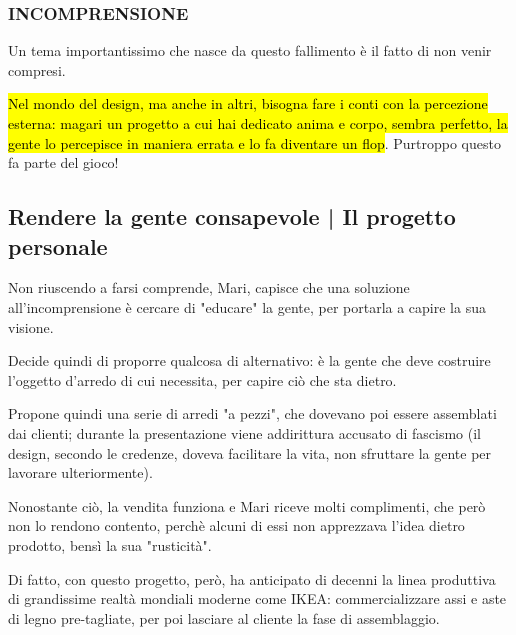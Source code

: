 \subsubsection{INCOMPRENSIONE}
Un tema importantissimo che nasce da questo fallimento è il fatto di non venir compresi. 

\hl{Nel mondo del design, ma anche in altri, bisogna fare i conti con la percezione esterna: magari un progetto a cui hai dedicato anima e corpo, sembra perfetto, la gente lo percepisce in maniera errata e lo fa diventare un flop}.
Purtroppo questo fa parte del gioco!

\subsection{Rendere la gente consapevole | Il progetto personale}
Non riuscendo a farsi comprende, Mari, capisce che una soluzione all'incomprensione è cercare di "educare" la gente, per portarla a capire la sua visione.

Decide quindi di proporre qualcosa di alternativo: è la gente che deve costruire l'oggetto d'arredo di cui necessita, per capire ciò che sta dietro.

Propone quindi una serie di arredi "a pezzi", che dovevano poi essere assemblati dai clienti; durante la presentazione viene addirittura accusato di fascismo (il design, secondo le credenze, doveva facilitare la vita, non sfruttare la gente per lavorare ulteriormente).

Nonostante ciò, la vendita funziona e Mari riceve molti complimenti, che però non lo rendono contento, perchè alcuni di essi non apprezzava l'idea dietro prodotto, bensì la sua "rusticità".

Di fatto, con questo progetto, però, ha anticipato di decenni la linea produttiva di grandissime realtà mondiali moderne come IKEA: commercializzare assi e aste di legno pre-tagliate, per poi lasciare al cliente la fase di assemblaggio.
